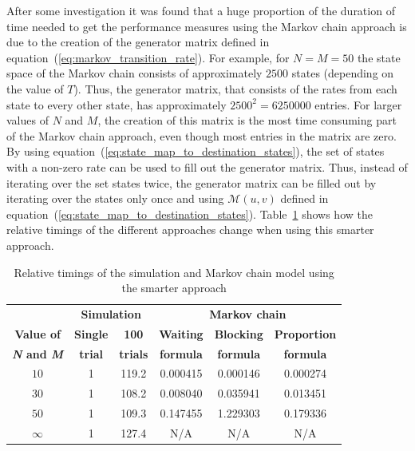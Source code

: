 After some investigation it was found that a huge proportion of the duration of
time needed to get the performance measures using the Markov chain approach is
due to the creation of the generator matrix defined in
equation~(\ref{eq:markov_transition_rate}).
For example, for \(N = M = 50\) the state space of the Markov chain consists
of approximately \(2500\) states (depending on the value of \(T\)).
Thus, the generator matrix, that consists of the rates from each state to every
other state, has approximately \(2500^2 = 6250000\) entries.
For larger values of \(N\) and \(M\), the creation of this matrix is the most
time consuming part of the Markov chain approach, even though most entries in
the matrix are zero.
By using equation~(\ref{eq:state_map_to_destination_states}), the set of states
with a non-zero rate can be used to fill out the generator matrix.
Thus, instead of iterating over the set states twice, the generator matrix can
be filled out by iterating over the states only once and using
\(\mathcal{M}(u,v)\) defined in
equation~(\ref{eq:state_map_to_destination_states}).
Table~\ref{tab:truncation_effect_timings_new} shows how the relative timings
of the different approaches change when using this smarter approach.


\tiny
\begin{table}[H]
    \centering
    \caption{Relative timings of the simulation and Markov chain model using
    the smarter approach}
    \begin{tabular}{c|cc|ccc}
        & \multicolumn{2}{c}{\textbf{Simulation}} & 
        \multicolumn{3}{c}{\textbf{Markov chain}} \\
        \textbf{Value of} & \textbf{Single} & \textbf{100} & 
        \textbf{Waiting} & \textbf{Blocking} & 
        \textbf{Proportion} \\
        \textbf{\textit{N} and \textit{M}} & \textbf{trial} & \textbf{trials} & 
        \textbf{formula} & \textbf{formula} & \textbf{formula} \\
        \hline
        \(10\) & 1 & 119.2 & 0.000415 & 0.000146 & 0.000274 \\
        \hline
        \(30\) & 1 & 108.2 & 0.008040 & 0.035941 & 0.013451 \\
        \hline
        \(50\) & 1 & 109.3 & 0.147455 & 1.229303 & 0.179336 \\
        \hline
        \(\infty\) & 1 & 127.4 & N/A & N/A & N/A \\
    \end{tabular}
    \label{tab:truncation_effect_timings_new}
\end{table}
\normalsize


